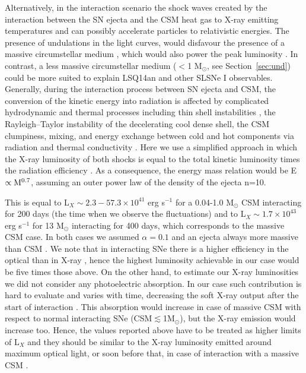 \documentclass[useAMS,usenatbib]{mn2e}
\def\M{M$_{\odot}$}
\def\an{LSQ14an}
\begin{document}
Alternatively, in the interaction scenario the shock waves created by the interaction between the SN ejecta and the CSM heat gas to X-ray emitting temperatures and can possibly accelerate particles to relativistic energies. The presence of undulations in the light curves, would disfavour the presence of a massive circumstellar medium \citep[7-19 \M\/;][]{ch13,ni16a}, which would also power the peak luminosity \citep{ci11}. In contrast, a less massive circumstellar medium ($<$1 \M, see Section~\ref{sec:und}) could be more suited to explain \an\/ and other SLSNe I observables.
Generally, during the interaction process between SN ejecta and CSM, the conversion of the kinetic energy into radiation is affected by complicated hydrodynamic and thermal processes including thin shell instabilities \citep{vi94}, the Rayleigh--Taylor
instability of the decelerating cool dense shell, the CSM clumpiness, mixing, and energy exchange between cold
and hot components via radiation and thermal conductivity \citep{cha15}. Here we use a simplified approach in which the X-ray luminosity of both shocks is equal to the total kinetic luminosity times the radiation efficiency \citep[$\alpha_{\rm X}>0.1$;][]{mo13,cha15}. As a consequence, the energy mass relation would be E~$\propto {\rm M}^{0.7}$, assuming an outer power law of the density of the ejecta n=10.


This is equal to L$_{X}\sim2.3-57.3\times10^{41}$ erg s$^{-1}$ for a 0.04-1.0 \M\/ CSM interacting for 200 days (the time when we observe the fluctuations) and to L$_{X}\sim1.7\times10^{43}$ erg s$^{-1}$ for 13 \M\/ interacting for 400 days, which corresponds to the massive CSM case. In both cases we assumed $\alpha=0.1$ and an ejecta always more massive than CSM \citep[e.g.][]{ch13,ni14}. We note that in interacting SNe there is a higher efficiency in the optical \citep[where $\alpha\geq0.5$;][]{mo13} than in X-ray \citep{of14,cha15}, hence the highest luminosity achievable in our case would be five times those above. On the other hand, to estimate our X-ray luminosities we did not consider any photoelectric absorption. In our case such contribution is hard to evaluate and varies with time, decreasing the soft X-ray output after the start of interaction \citep[see][]{ch03}. This absorption would increase in case of massive CSM with respect to normal interacting SNe (CSM$\lesssim$1\M), but the X-ray emission would increase too. Hence, the values reported above have to be treated as higher limits of L$_{X}$ and they should be similar to the X-ray luminosity emitted around maximum optical light, or soon before that, in case of interaction with a massive CSM \citep[see][]{ch03}.
\end{document}
